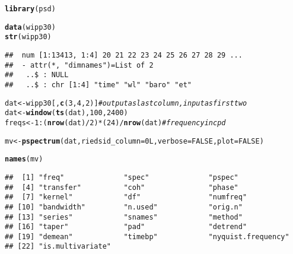 \documentclass[11pt]{article}\usepackage[]{graphicx}\usepackage[]{color}
\makeatletter
\newcommand{\hlnum}[1]{\textcolor[rgb]{0.686,0.059,0.569}{#1}}%
\newcommand{\hlcom}[1]{\textcolor[rgb]{0.678,0.584,0.686}{\textit{#1}}}%
\newcommand{\hlopt}[1]{\textcolor[rgb]{0,0,0}{#1}}%
\newcommand{\hlstd}[1]{\textcolor[rgb]{0.345,0.345,0.345}{#1}}%
\newcommand{\hlkwb}[1]{\textcolor[rgb]{0.69,0.353,0.396}{#1}}%
\newcommand{\hlkwc}[1]{\textcolor[rgb]{0.333,0.667,0.333}{#1}}%
\newcommand{\hlkwd}[1]{\textcolor[rgb]{0.737,0.353,0.396}{\textbf{#1}}}%
\newenvironment{kframe}{%
 \def\at@end@of@kframe{}%
 \ifinner\ifhmode%
  \def\at@end@of@kframe{\end{minipage}}%
  \begin{minipage}{\columnwidth}%
 \fi\fi%
 \def\FrameCommand##1{\hskip\@totalleftmargin \hskip-\fboxsep
 \colorbox{shadecolor}{##1}\hskip-\fboxsep
     \hskip-\linewidth \hskip-\@totalleftmargin \hskip\columnwidth}%
 \MakeFramed {\advance\hsize-\width
   \@totalleftmargin\z@ \linewidth\hsize
   \@setminipage}}%
 {\par\unskip\endMakeFramed%
 \at@end@of@kframe}
\newenvironment{knitrout}{}{} %
\makeatother
\begin{document}
\begin{knitrout}
\color{fgcolor}\begin{kframe}
\begin{alltt}
\hlkwd{library}\hlstd{(psd)}
\end{alltt}


{\ttfamily\noindent\itshape\color{messagecolor}{\#\# Loaded psd (2.1.1) -- Adaptive multitaper spectrum estimation; to start, see ?pspectrum}}\begin{alltt}
\hlkwd{data}\hlstd{(wipp30)}
\hlkwd{str}\hlstd{(wipp30)}
\end{alltt}
\begin{verbatim}
##  num [1:13413, 1:4] 20 21 22 23 24 25 26 27 28 29 ...
##  - attr(*, "dimnames")=List of 2
##   ..$ : NULL
##   ..$ : chr [1:4] "time" "wl" "baro" "et"
\end{verbatim}
\begin{alltt}
\hlstd{dat} \hlkwb{<-} \hlstd{wipp30[,} \hlkwd{c}\hlstd{(}\hlnum{3}\hlstd{,}\hlnum{4}\hlstd{,}\hlnum{2}\hlstd{)]} \hlcom{# output as last column, input as first two}
\hlstd{dat} \hlkwb{<-} \hlkwd{window}\hlstd{(}\hlkwd{ts}\hlstd{(dat),} \hlnum{100}\hlstd{,} \hlnum{2400}\hlstd{)}
\hlstd{freqs} \hlkwb{<-} \hlnum{1}\hlopt{:}\hlstd{(}\hlkwd{nrow}\hlstd{(dat)}\hlopt{/}\hlnum{2}\hlstd{)} \hlopt{*} \hlstd{(}\hlnum{24}\hlstd{)} \hlopt{/} \hlkwd{nrow}\hlstd{(dat)} \hlcom{# frequency in cpd}
\end{alltt}
\end{kframe}
\end{knitrout}

\begin{knitrout}
\color{fgcolor}\begin{kframe}
\begin{alltt}
\hlstd{mv} \hlkwb{<-} \hlkwd{pspectrum}\hlstd{(dat,} \hlkwc{riedsid_column}\hlstd{=} \hlnum{0L}\hlstd{,} \hlkwc{verbose} \hlstd{=} \hlnum{FALSE}\hlstd{,} \hlkwc{plot} \hlstd{=} \hlnum{FALSE}\hlstd{)}
\end{alltt}
\end{kframe}
\end{knitrout}


\begin{knitrout}
\color{fgcolor}\begin{kframe}
\begin{alltt}
\hlkwd{names}\hlstd{(mv)}
\end{alltt}
\begin{verbatim}
##  [1] "freq"              "spec"              "pspec"            
##  [4] "transfer"          "coh"               "phase"            
##  [7] "kernel"            "df"                "numfreq"          
## [10] "bandwidth"         "n.used"            "orig.n"           
## [13] "series"            "snames"            "method"           
## [16] "taper"             "pad"               "detrend"          
## [19] "demean"            "timebp"            "nyquist.frequency"
## [22] "is.multivariate"
\end{verbatim}
\end{kframe}
\end{knitrout}
\end{document}
